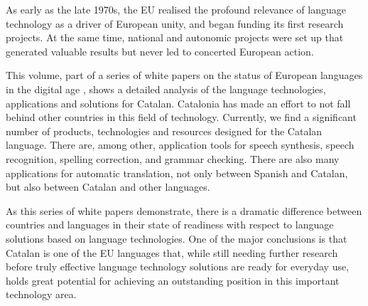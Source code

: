 \begin{multicols}{2}
As early as the late 1970s, the EU realised the profound relevance of language technology as a driver of European unity, and began funding its first research projects. At the same time, national and autonomic projects were set up that generated valuable results but never led to concerted European action. 

This volume, part of a series of white papers on the status of European languages in the digital age \cite{Meta1}, shows a detailed analysis of the language technologies, applications and solutions for Catalan. Catalonia has made an effort to not fall behind other countries in this field of technology. Currently, we find a significant number of products, technologies and resources designed for the Catalan language. There are, among other, application tools for speech synthesis, speech recognition, spelling correction, and grammar checking. There are also many applications for automatic translation, not only between Spanish and Catalan, but also between Catalan and other languages.

As this series of white papers demonstrate, there is a dramatic difference between countries and languages in their state of readiness with respect to language solutions based on language technologies. One of the major conclusions is that Catalan is one of the EU languages that, while still needing further research before truly effective language technology solutions are ready for everyday use, holds great potential for achieving an outstanding position in this important technology area.
\end{multicols}

\clearpage


